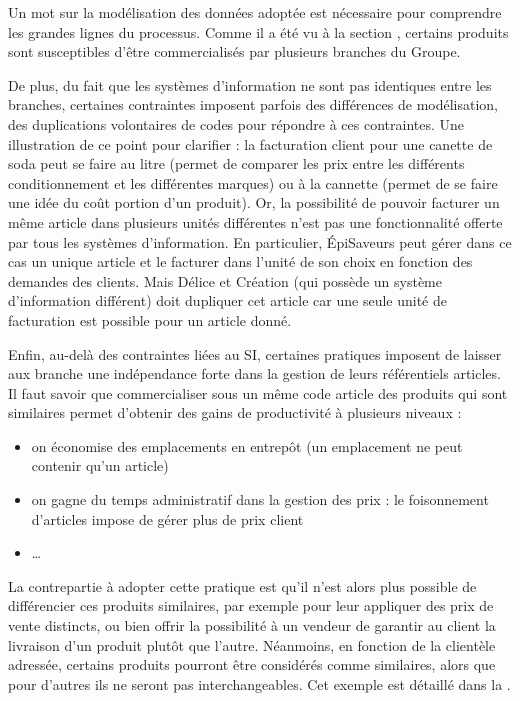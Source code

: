             Un mot sur la modélisation des données adoptée est nécessaire pour comprendre les grandes lignes du processus.
            Comme il a été vu à la section , certains produits sont susceptibles d'être commercialisés par plusieurs branches du Groupe.
            
            De plus, du fait que les systèmes d'information ne sont pas identiques entre les branches, certaines contraintes imposent parfois des différences de modélisation, des duplications volontaires de codes pour répondre à ces contraintes.
            Une illustration de ce point pour clarifier : la facturation client pour une canette de soda peut se faire au litre (permet de comparer les prix entre les différents conditionnement et les différentes marques) ou à la cannette (permet de se faire une idée du coût portion d'un produit).
            Or, la possibilité de pouvoir facturer un même article dans plusieurs unités différentes n'est pas une fonctionnalité offerte par tous les systèmes d'information.
            En particulier, \'{E}piSaveurs peut gérer dans ce cas un unique article et le facturer dans l'unité de son choix en fonction des demandes des clients.
            Mais Délice et Création (qui possède un système d'information différent) doit dupliquer cet article car une seule unité de facturation est possible pour un article donné.

            Enfin, au-delà des contraintes liées au SI, certaines pratiques imposent de laisser aux branche une indépendance forte dans la gestion de leurs référentiels articles.
            Il faut savoir que commercialiser sous un même code article des produits qui sont similaires permet d'obtenir des gains de productivité à plusieurs niveaux :
            \begin{itemize}
                \item on économise des emplacements en entrepôt (un emplacement ne peut contenir qu'un article)
                \item on gagne du temps administratif dans la gestion des prix : le foisonnement d'articles impose de gérer plus de prix client
                \item \dots
            \end{itemize}
            La contrepartie à adopter cette pratique est qu'il n'est alors plus possible de différencier ces produits similaires, par exemple pour leur appliquer des prix de vente distincts, ou bien offrir la possibilité à un vendeur de garantir au client la livraison d'un produit plutôt que l'autre.
            Néanmoins, en fonction de la clientèle adressée, certains produits pourront être considérés comme similaires, alors que pour d'autres ils ne seront pas interchangeables.
            Cet exemple est détaillé dans la .

